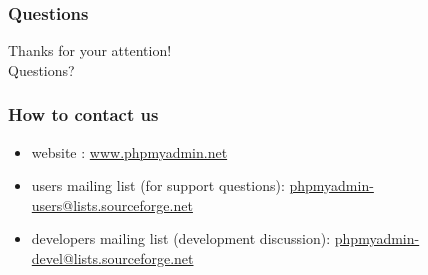 \documentclass[14pt]{beamer}
\begin{document}
  \begin{frame}
  \frametitle{Questions}
    Thanks for your attention!\\
    Questions?
  \end{frame}
  \begin{frame}
    \frametitle{How to contact us}
    \begin{itemize}
      \item website : \href{http://www.phpmyadmin.net/}{www.phpmyadmin.net}
      \item users mailing list (for support questions): \href{mailto:phpmyadmin-users@lists.sourceforge.net}{phpmyadmin-users@lists.sourceforge.net}
      \item developers mailing list (development discussion): \href{mailto:phpmyadmin-devel@lists.sourceforge.net}{phpmyadmin-devel@lists.sourceforge.net}
    \end{itemize}
  \end{frame}
\end{document}
